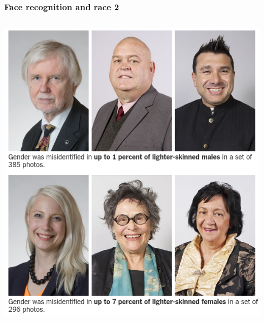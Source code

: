 \documentclass{beamer}
\begin{document}
\begin{frame}
\frametitle{Face recognition and race 2}
\begin{columns}
    \begin{column}{0.45\textwidth}
        \includegraphics[width=1\textwidth]{./images/gender_race_1.png}
    \end{column}
    

\end{columns}
\end{frame}
\end{document}
